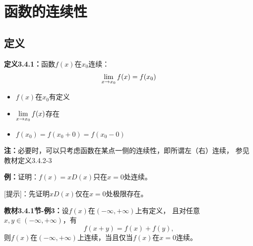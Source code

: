 \section{函数的连续性}

\subsection{定义}

{\bf 定义3.4.1：}函数$f(x)$在$x_0$连续：
$$\lim\limits_{x\to{x_0}}f(x)=f(x_0)$$

\begin{itemize}
  \item $f(x)$在$x_0$有定义 
  \item $\lim\limits_{x\to{x_0}}f(x)$存在 
  \item $f(x_0)=f(x_0+0)=f(x_0-0)$
\end{itemize}

{\bf 注：}必要时，可以只考虑函数在某点一侧的连续性，即所谓左（右）连续，
参见教材定义3.4.2-3

{\bf 例：}证明：$f(x)=xD(x)$只在$x=0$处连续。

[提示]：先证明$xD(x)$仅在$x=0$处极限存在。

{\bf 教材3.4.1节-例3：}设$f(x)$在$(-\infty,+\infty)$上有定义，
且对任意$x,y\in (-\infty,+\infty)$，有
$$f(x+y)=f(x)+f(y),$$
则$f(x)$在$(-\infty,+\infty)$上连续，当且仅当$f(x)$在$x=0$连续。


